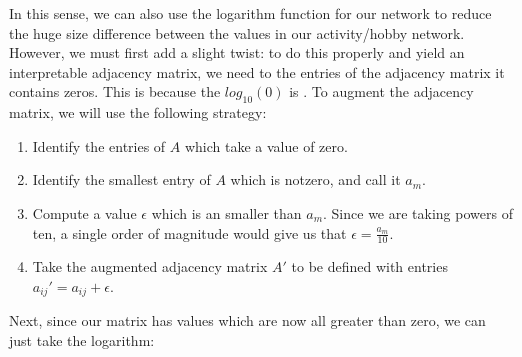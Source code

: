 \documentclass[letterpaper,10pt,english]{jupyterBook}
\begin{document}
\sphinxAtStartPar
In this sense, we can also use the logarithm function for our network to reduce the huge size difference between the values in our activity/hobby network. However, we must first add a slight twist: to do this properly and yield an interpretable adjacency matrix, we need to  the entries of the adjacency matrix  it contains zeros. This is because the \(log_{10}(0)\) is . To augment the adjacency matrix, we will use the following strategy:
\begin{enumerate}
%
\item {} 
\sphinxAtStartPar
Identify the entries of \(A\) which take a value of zero.

\item {} 
\sphinxAtStartPar
Identify the smallest entry of \(A\) which is not\sphinxhyphen{}zero, and call it \(a_m\).

\item {} 
\sphinxAtStartPar
Compute a value \(\epsilon\) which is an  smaller than \(a_m\). Since we are taking powers of ten, a single order of magnitude would give us that \(\epsilon = \frac{a_m}{10}\).

\item {} 
\sphinxAtStartPar
Take the augmented adjacency matrix \(A'\) to be defined with entries \(a_{ij}' = a_{ij} + \epsilon\).

\end{enumerate}

\sphinxAtStartPar
Next, since our matrix has values which are now all greater than zero, we can just take the logarithm:

\begin{sphinxVerbatim}[commandchars=\\\{\}]
 
       
         
      \PYG{p}{[}  \PYG{p}{]}  
        
         

  
  
\end{sphinxVerbatim}
\end{document}
